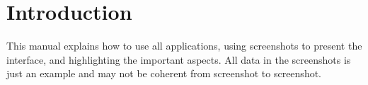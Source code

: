 \documentclass[12pt,openright,twoside]{report}
\begin{document}


\tableofcontents

\cleardoublepage

\pagestyle{fancy}
\renewcommand{\sectionmark}[1]{\markright{#1}}
\renewcommand{\headrulewidth}{0pt}
\fancyhf{}
\lhead{}
\rhead{} 
\fancyfoot[C]{\thepage}

\section*{Introduction}

This manual explains how to use all applications, using screenshots to present the interface, and highlighting the important aspects. All data in the screenshots is just an example and may not be coherent from screenshot to screenshot. 










\end{document}
